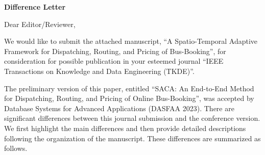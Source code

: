 \documentclass[11pt, a4paper]{article}
\begin{document}
\begin{center}
\Large{\textbf{Difference Letter}}\vspace{1mm}\\
\end{center}

\noindent
Dear Editor/Reviewer, 

We would like to submit the attached manuscript, ``A Spatio-Temporal Adaptive Framework for Dispatching, Routing, and Pricing of Bus-Booking'', for consideration for possible publication in your esteemed journal ``IEEE Transactions on Knowledge and Data Engineering  (TKDE)''.

The preliminary version of this paper, entitled ``SACA: An End-to-End Method for Dispatching, Routing, and Pricing of Online Bus-Booking'', was accepted by Database Systems for Advanced Applications (DASFAA 2023). There are significant differences between this journal submission and the conference version. We first highlight the main differences and then provide detailed descriptions following the organization of the manuscript. These differences are summarized as follows.
\end{document}

